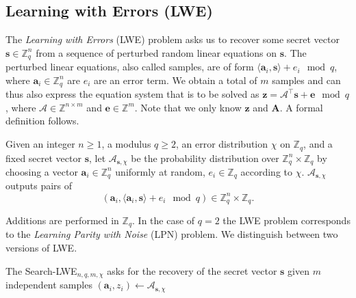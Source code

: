\subsection{Learning with Errors (LWE)} \label{sec:lwe}
The \textit{Learning with Errors} (LWE) problem asks us to recover some secret vector $\mathbf{s} \in \mathbb{Z}_q^n$ from a sequence of perturbed random linear equations on $\mathbf{s}$. The perturbed linear equations, also called samples, are of form $\langle\mathbf{a}_i, \mathbf{s}\rangle + e_i \mod q$, where $\mathbf{a}_i \in \mathbb{Z}_q^n$ are $e_i$ are an error term. We obtain a total of $m$ samples and can thus also express the equation system that is to be solved as $\mathbf{z} = \mathcal{A}^\intercal \mathbf{s} + \mathbf{e} \mod q$, where $\mathcal{A} \in \mathbb{Z}^{n \times m}$ and $\mathbf{e} \in \mathbb{Z}^m$. Note that we only know $\mathbf{z}$ and $\mathbf{A}$. A formal definition follows.

\begin{definition} %
    Given an integer $n \geq 1$, a modulus $q \geq 2$, an error distribution $\chi$ on $\mathbb{Z}_q$, and a fixed secret vector $\mathbf{s}$, let $\mathcal{A}_{\mathbf{s}, \chi}$ be the probability distribution over $\mathbb{Z}_q^n \times \mathbb{Z}_q$ by choosing a vector $\mathbf{a}_i \in \mathbb{Z}_q^n$ uniformly at random, $e_i \in \mathbb{Z}_q$ according to $\chi$.  $\mathcal{A}_{\mathbf{s}, \chi}$ outputs pairs of
    \begin{equation}
        (\mathbf{a}_i, \langle \mathbf{a}_i, \mathbf{s} \rangle + e_i \mod q) \in \mathbb{Z}_q^n \times \mathbb{Z}_q.
    \end{equation}
\end{definition}

Additions are performed in $\mathbb{Z}_q$. In the case of $q=2$ the LWE problem corresponds to the \textit{Learning Parity with Noise} (LPN) problem. %
We distinguish between two versions of LWE.

\begin{definition} %
    The Search-LWE$_{n, q, m, \chi}$ asks for the recovery of the secret vector $\mathbf{s}$ given $m$ independent samples $(\mathbf{a}_i, z_i) \leftarrow \mathcal{A}_{\mathbf{s}, \chi}$ %
\end{definition}

